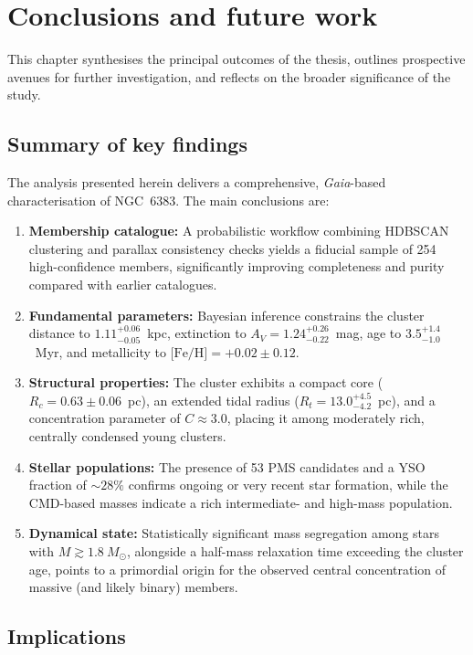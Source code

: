 \documentclass[../main.tex]{subfiles}
\begin{document}
\section{Conclusions and future work}
\label{chap:conclusions}

This chapter synthesises the principal outcomes of the thesis, outlines prospective avenues for further investigation, and reflects on the broader significance of the study.

\subsection{Summary of key findings}
\label{subsec:conclusions-summary}

The analysis presented herein delivers a comprehensive, \textit{Gaia}-based characterisation of NGC~6383. The main conclusions are:
\begin{enumerate}
  \item \textbf{Membership catalogue:} A probabilistic workflow combining HDBSCAN clustering and parallax consistency checks yields a fiducial sample of 254 high-confidence members, significantly improving completeness and purity compared with earlier catalogues.
  \item \textbf{Fundamental parameters:} Bayesian inference constrains the cluster distance to $1.11^{+0.06}_{-0.05}$~kpc, extinction to $A_V = 1.24^{+0.26}_{-0.22}$~mag, age to $3.5^{+1.4}_{-1.0}$~Myr, and metallicity to $\text{[Fe/H]} = +0.02 \pm 0.12$.
  \item \textbf{Structural properties:} The cluster exhibits a compact core ($R_c = 0.63 \pm 0.06$~pc), an extended tidal radius ($R_t = 13.0^{+4.5}_{-4.2}$~pc), and a concentration parameter of $C \approx 3.0$, placing it among moderately rich, centrally condensed young clusters.
  \item \textbf{Stellar populations:} The presence of 53 PMS candidates and a YSO fraction of $\sim28\%$ confirms ongoing or very recent star formation, while the CMD-based masses indicate a rich intermediate- and high-mass population.
  \item \textbf{Dynamical state:} Statistically significant mass segregation among stars with $M\gtrsim1.8~M_\odot$, alongside a half-mass relaxation time exceeding the cluster age, points to a primordial origin for the observed central concentration of massive (and likely binary) members.
\end{enumerate}

\subsection{Implications}
\label{subsec:conclusions-implications}
\end{document}
